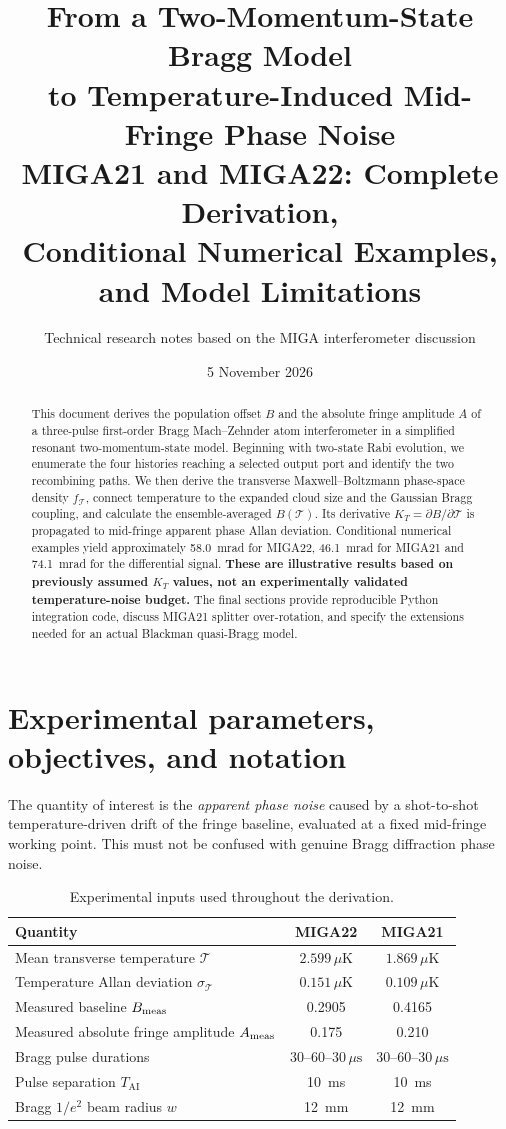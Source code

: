 \documentclass[11pt,a4paper]{article}
\title{\bfseries From a Two-Momentum-State Bragg Model\\
  to Temperature-Induced Mid-Fringe Phase Noise\\[6pt]
  \large MIGA21 and MIGA22: Complete Derivation,\\ Conditional Numerical Examples, and Model Limitations}
\author{Technical research notes based on the MIGA interferometer discussion}
\date{5 November 2026}
\numberwithin{equation}{section}
\newcommand{\Tat}{\mathcal{T}}
\newcommand{\Tai}{T_{\mathrm{AI}}}
\begin{document}
\maketitle
\begin{abstract}
This document derives the population offset $B$ and the absolute fringe amplitude
$A$ of a three-pulse first-order Bragg Mach--Zehnder atom interferometer in a
simplified resonant two-momentum-state model. Beginning with two-state Rabi
evolution, we enumerate the four histories reaching a selected output port and
identify the two recombining paths. We then derive the transverse
Maxwell--Boltzmann phase-space density $f_{\Tat}$, connect temperature to the
expanded cloud size and the Gaussian Bragg coupling, and calculate the
ensemble-averaged $B(\Tat)$. Its derivative $K_T=\partial B/\partial\Tat$ is
propagated to mid-fringe apparent phase Allan deviation. Conditional numerical
examples yield approximately \SI{58.0}{mrad} for MIGA22, \SI{46.1}{mrad} for
MIGA21 and \SI{74.1}{mrad} for the differential signal.
\textbf{These are illustrative results based on previously assumed $K_T$
values, not an experimentally validated temperature-noise budget.}
The final sections provide reproducible Python integration code, discuss
MIGA21 splitter over-rotation, and specify the extensions needed for an actual
Blackman quasi-Bragg model.
\end{abstract}
\tableofcontents
\newpage

\section{Experimental parameters, objectives, and notation}

The quantity of interest is the \emph{apparent phase noise} caused by a
shot-to-shot temperature-driven drift of the fringe baseline, evaluated at a
fixed mid-fringe working point. This must not be confused with genuine
Bragg diffraction phase noise.

\begin{table}[ht]
\centering
\caption{Experimental inputs used throughout the derivation.}
\begin{tabular}{lcc}\toprule
Quantity & MIGA22 & MIGA21\\\midrule
Mean transverse temperature $\Tat$ & $2.599\,\mu\mathrm K$ & $1.869\,\mu\mathrm K$\\
Temperature Allan deviation $\sigma_\Tat$ & $0.151\,\mu\mathrm K$ & $0.109\,\mu\mathrm K$\\
Measured baseline $B_{\rm meas}$ & 0.2905 & 0.4165\\
Measured absolute fringe amplitude $A_{\rm meas}$ & 0.175 & 0.210\\
Bragg pulse durations & $30$--$60$--$30\,\mu\mathrm s$ & $30$--$60$--$30\,\mu\mathrm s$\\
Pulse separation $\Tai$ & \SI{10}{ms} & \SI{10}{ms}\\
Bragg $1/e^2$ beam radius $w$ & \SI{12}{mm} & \SI{12}{mm}\\\bottomrule
\end{tabular}
\end{table}
\end{document}
